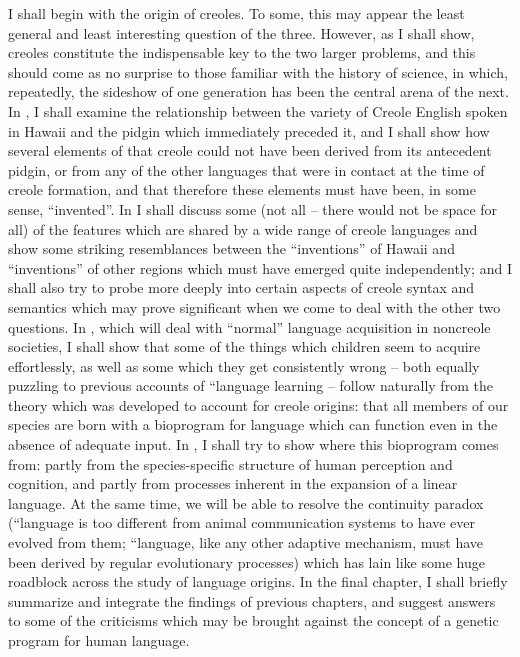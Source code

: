 I shall begin with the origin of creoles. To some, this may appear the least general and least interesting question of the three. However, as I shall show, creoles constitute the indispensable key to the two larger problems, and this should come as no surprise to those familiar with the history of science, in which, repeatedly, the sideshow of one generation has been the central arena of the next. In , I shall examine the relationship between the variety of Creole English spoken in Hawaii and the pidgin which immediately preceded it, and I shall show how several elements of that creole could not have been derived from its antecedent pidgin, or from any of the other languages that were in contact at the time of creole formation, and that therefore these elements must have been, in some sense, ``invented''.  In  I shall discuss some (not all -- there would not be space for all) of the features which are shared by a wide range of creole languages and show some striking resemblances between the ``inventions'' of Hawaii and ``inventions'' of other regions which must have emerged quite independently; and I shall also try to probe more deeply into certain aspects of creole syntax and semantics which may prove signifi\-cant when we come to deal with the other two questions. In , which will deal with ``normal'' language acquisition in noncreole societies, I shall show that some of the things which children seem to acquire effortlessly, as well as some which they get consistently wrong -- both equally puzzling to previous accounts of ``language learning{\textquotedbl} -- follow naturally from the theory which was developed to account for creole origins: that all members of our species are born with a bio\-program for language which can function even in the absence of ade\-quate input. In , I shall try to show where this bioprogram comes from: partly from the species-specific structure of human perception and cognition, and partly from processes inherent in the expansion of a linear language. At the same time, we will be able to resolve the continuity paradox (``language is too different from animal communication systems to have ever evolved from them{\textquotedbl}; ``language, like any other adaptive mechanism, must have been derived by regular evolutionary processes{\textquotedbl}) which has lain like some huge roadblock across the study of language origins. In the final chapter, I shall briefly summarize and integrate the findings of previous chapters, and suggest answers to some of the criticisms which may be brought against the concept of a genetic program for human language.